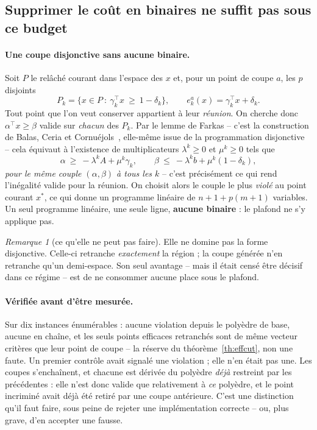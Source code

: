\documentclass[11pt,a4paper]{article}
\theoremstyle{plain}
\theoremstyle{remark}
\newtheorem{remark}{Remarque}
\begin{document}
\subsection{Supprimer le coût en binaires ne suffit pas sous ce budget}
\label{sec:cglp}

\paragraph{Une coupe disjonctive sans aucune binaire.} Soit $P$ le relâché
courant dans l'espace des $x$ et, pour un point de coupe $a$, les $p$
disjoints
\[
  P_k=\bigl\{x\in P\ :\ \gamma_k^{\top}x\ \ge\ 1-\delta_k\bigr\},
  \qquad e^a_k(x)=\gamma_k^{\top}x+\delta_k .
\]
Tout point que l'on veut conserver appartient à leur \emph{réunion}. On
cherche donc $\alpha^{\top}x\ge\beta$ valide sur \emph{chacun} des $P_k$.
Par le lemme de Farkas -- c'est la construction de Balas, Ceria et
Cornuéjols~\cite{balas1993}, elle-même issue de la programmation
disjonctive~\cite{balas1979} -- cela équivaut à l'existence de
multiplicateurs
$\lambda^k\ge 0$ et $\mu^k\ge 0$ tels que
\[
  \alpha\ \ge\ -\lambda^k A+\mu^k\gamma_k,
  \qquad
  \beta\ \le\ -\lambda^k b+\mu^k(1-\delta_k),
\]
\emph{pour le même couple $(\alpha,\beta)$ à tous les $k$} -- c'est
précisément ce qui rend l'inégalité valide pour la réunion. On choisit alors
le couple le plus \emph{violé} au point courant $x^{\ast}$, ce qui donne un
programme linéaire de $n+1+p(m+1)$ variables. Un seul programme linéaire,
une seule ligne, \textbf{aucune binaire} : le plafond ne s'y applique pas.

\begin{remark}[ce qu'elle ne peut pas faire]
Elle ne domine pas la forme disjonctive. Celle-ci retranche \emph{exactement}
la région ; la coupe générée n'en retranche qu'un demi-espace. Son seul
avantage -- mais il était censé être décisif dans ce régime -- est de ne
consommer aucune place sous le plafond.
\end{remark}

\paragraph{Vérifiée avant d'être mesurée.} Sur dix instances énumérables :
aucune violation depuis le polyèdre de base, aucune en chaîne, et les seuls
points efficaces retranchés sont de même vecteur critères que leur point de
coupe -- la réserve du théorème~\ref{th:effcut}, non une faute. Un premier
contrôle avait signalé une violation ; elle n'en était pas une. Les coupes
s'enchaînent, et chacune est dérivée du polyèdre \emph{déjà} restreint par
les précédentes : elle n'est donc valide que relativement à \emph{ce}
polyèdre, et le point incriminé avait déjà été retiré par une coupe
antérieure. C'est une distinction qu'il faut faire, sous peine de rejeter
une implémentation correcte -- ou, plus grave, d'en accepter une fausse.
\end{document}
